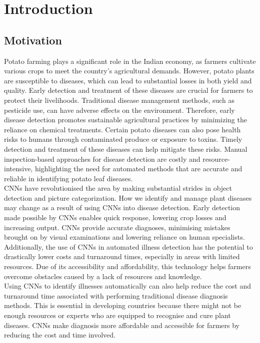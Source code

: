 \documentclass[conference]{IEEEtran}
\begin{document}
\IEEEpeerreviewmaketitle



\section{Introduction}



\subsection{Motivation}
Potato farming plays a significant role in the Indian economy, as farmers cultivate various crops to meet the country's agricultural demands. However, potato plants are susceptible to diseases, which can lead to substantial losses in both yield and quality. Early detection and treatment of these diseases are crucial for farmers to protect their livelihoods. Traditional disease management methods, such as pesticide use, can have adverse effects on the environment. Therefore, early disease detection promotes sustainable agricultural practices by minimizing the reliance on chemical treatments. Certain potato diseases can also pose health risks to humans through contaminated produce or exposure to toxins. Timely detection and treatment of these diseases can help mitigate these risks. Manual inspection-based approaches for disease detection are costly and resource-intensive, highlighting the need for automated methods that are accurate and reliable in identifying potato leaf diseases. \\ 

CNNs have revolutionised the area by making substantial strides in object detection and picture categorization. How we identify and manage plant diseases may change as a result of using CNNs into disease detection. Early detection made possible by CNNs enables quick response, lowering crop losses and increasing output. CNNs provide accurate diagnoses, minimising mistakes brought on by visual examinations and lowering reliance on human specialists. Additionally, the use of CNNs in automated illness detection has the potential to drastically lower costs and turnaround times, especially in areas with limited resources. Due of its accessibility and affordability, this technology helps farmers overcome obstacles caused by a lack of resources and knowledge.\\ 

Using CNNs to identify illnesses automatically can also help reduce the cost and turnaround time associated with performing traditional disease diagnosis methods. This is essential in developing countries because there might not be enough resources or experts who are equipped to recognise and cure plant diseases. CNNs make diagnosis more affordable and accessible for farmers by reducing the cost and time involved.
\end{document}
